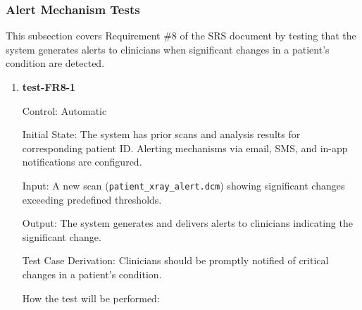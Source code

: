 \documentclass[12pt, titlepage]{article}
\begin{document}
\subsubsection{Alert Mechanism Tests}

This subsection covers Requirement \#8 of the SRS document by testing that the system generates alerts to clinicians when significant changes in a patient's condition are detected.

\begin{enumerate}

  \item \textbf{test-FR8-1} \label{test-FR8-1}
  
  Control: Automatic
  
  Initial State: The system has prior scans and analysis results for corresponding patient ID. Alerting mechanisms via email, SMS, and in-app notifications are configured.
  
  Input: A new scan (\texttt{patient\_xray\_alert.dcm}) showing significant changes exceeding predefined thresholds.
  
  Output: The system generates and delivers alerts to clinicians indicating the significant change.
  
  Test Case Derivation: Clinicians should be promptly notified of critical changes in a patient's condition.
  
  How the test will be performed:
  

\end{enumerate}
\end{document}
